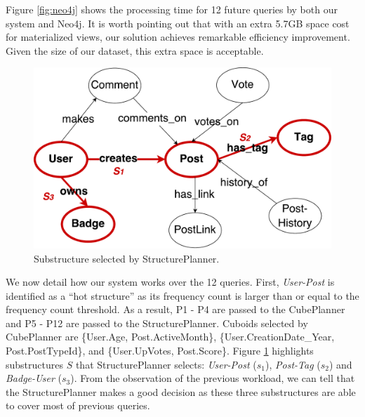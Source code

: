 Figure \ref{fig:neo4j} shows the processing time for 12 future queries by both our system and Neo4j. It is worth pointing out that with an extra 5.7GB space cost for materialized views, our solution achieves remarkable efficiency improvement. Given the size of our dataset, this extra space is acceptable.

\begin{figure}[H]
	\centering
	\includegraphics[scale=0.6]{pic/expmetaS.pdf}
	\caption{Substructure selected by StructurePlanner.}
	\label{fig:metagraphexperimenthot}
\end{figure}

We now detail how our system works over the 12 queries. First, \textit{User-Post} is identified as a ``hot structure'' as its frequency count is larger than or equal to the frequency count threshold. As a result, P1 - P4 are passed to the CubePlanner and P5 - P12 are passed to the StructurePlanner. Cuboids selected by CubePlanner are \{User.Age, Post.ActiveMonth\}, \{User.CreationDate\_Year, Post.PostTypeId\}, and \{User.UpVotes, Post.Score\}. Figure \ref{fig:metagraphexperimenthot} highlights substructures $S$ that StructurePlanner selects:  \textit{User-Post} ($s_1$), \textit{Post-Tag} ($s_2$) and \textit{Badge-User} ($s_3$). From the observation of the previous workload, we can tell that the StructurePlanner makes a good decision as these three substructures are able to cover most of previous queries.

